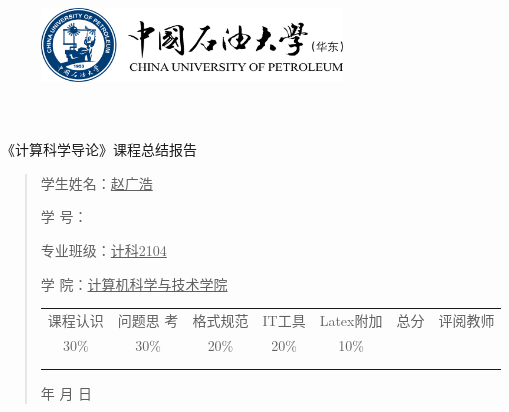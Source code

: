 \documentclass[square]{article}
\renewcommand{\today}{\number\year 年 \number\month 月 \number\day 日}
\begin{document}
\begin{figure}
    \centering
    \includegraphics[width=8cm]{upc.png}

    \label{figupc}
\end{figure}

	\begin{center}
		\quad \\
		\quad \\
		\heiti \fontsize{45}{17} \quad \quad \quad 
		\vskip 1.5cm
		\heiti {} 《计算科学导论》课程总结报告
	\end{center}
	\vskip 2.0cm
		
	\begin{quotation}
		\doublespacing
		
        \par\setlength\parindent{7em}
		\quad 

		学生姓名：\underline{\qquad  赵广浩 \qquad \qquad}

		学\hspace{0.61cm} 号：\underline{\qquad}
		
		专业班级：\underline{\qquad 计科2104 \qquad  }
		
        学\hspace{0.61cm} 院：\underline{计算机科学与技术学院}
		\vskip 2cm
		\centering
		\begin{table}[h]
            \centering 
            \begin{tabular}{|c|c|c|c|c|c|c|}
                \hline
                课程认识 & 问题思 考 & 格式规范  & IT工具  & Latex附加  & 总分 & 评阅教师 \\
                30\% & 30\% & 20\% & 20\% & 10\% &  &  \\
                \hline
                 & & & & & &\\
                & & & & & &\\
                \hline
            \end{tabular}
        \end{table}
		\vskip 2cm
		\today
	\end{quotation}
\end{document}
